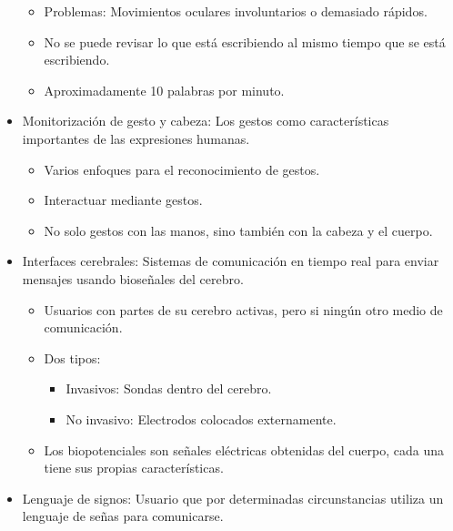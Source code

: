 \documentclass[12pt, twoside, openright]{report} %
\begin{document}
\begin{itemize}
    \begin{itemize}
    
    \item
      Problemas: Movimientos oculares involuntarios o demasiado rápidos.
    \item
      No se puede revisar lo que está escribiendo al mismo tiempo que se
      está escribiendo.
    \item
      Aproximadamente 10 palabras por minuto.
    \end{itemize}
	\pagebreak
  \item
    Monitorización de gesto y cabeza: Los gestos como características
    importantes de las expresiones humanas.

    \begin{itemize}
    
    \item
      Varios enfoques para el reconocimiento de gestos.
    \item
      Interactuar mediante gestos.
    \item
      No solo gestos con las manos, sino también con la cabeza y el
      cuerpo.
    \end{itemize}
  \item
    Interfaces cerebrales: Sistemas de comunicación en tiempo real para
    enviar mensajes usando bioseñales del cerebro.

    \begin{itemize}
    
    \item
      Usuarios con partes de su cerebro activas, pero si ningún otro
      medio de comunicación.
    \item
      Dos tipos:

      \begin{itemize}
      
      \item
        Invasivos: Sondas dentro del cerebro.
      \item
        No invasivo: Electrodos colocados externamente.
      \end{itemize}
    \item
      Los biopotenciales son señales eléctricas obtenidas del cuerpo,
      cada una tiene sus propias características.
    \end{itemize}
  \item
    Lenguaje de signos: Usuario que por determinadas circunstancias
    utiliza un lenguaje de señas para comunicarse.


\end{itemize}
\end{document}
